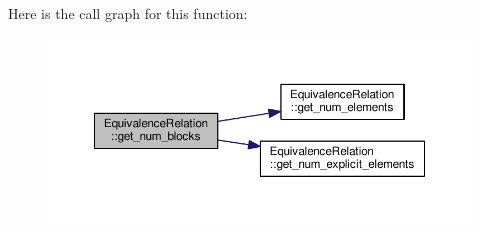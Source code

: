 Here is the call graph for this function\-:
\nopagebreak
\begin{figure}[H]
\begin{center}
\leavevmode
\includegraphics[width=350pt]{classEquivalenceRelation_a29c0989de637b4b6ba8ca585fe94e3a4_cgraph}
\end{center}
\end{figure}


